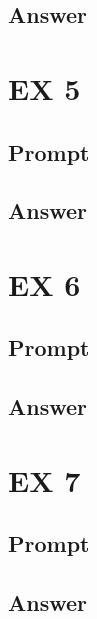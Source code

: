 \documentclass[10pt,a4paper]{article}
\theoremstyle{definition}
\begin{document}
\subsection{Answer}

\section{EX 5}
\subsection{Prompt}
\subsection{Answer}

\section{EX 6}
\subsection{Prompt}
\subsection{Answer}

\section{EX 7}
\subsection{Prompt}
\subsection{Answer}
\end{document}
